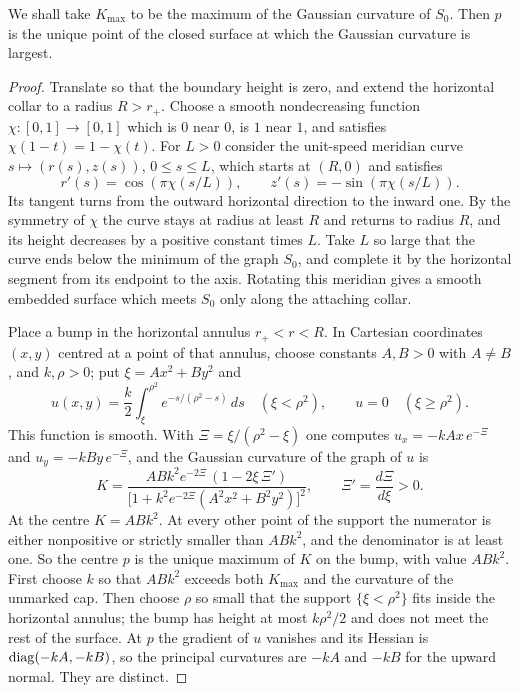We shall take $K_{\max}$ to be the maximum of the Gaussian curvature
of $S_0$. Then $p$ is the unique point of the closed surface at which
the Gaussian curvature is largest.

\begin{proof}
Translate so that the boundary height is zero, and extend the
horizontal collar to a radius $R>r_+$. Choose a smooth nondecreasing
function $\chi:[0,1]\to[0,1]$ which is $0$ near $0$, is $1$ near $1$,
and satisfies $\chi(1-t)=1-\chi(t)$. For $L>0$ consider the unit-speed
meridian curve $s\mapsto(r(s),z(s))$, $0\le s\le L$, which starts at
$(R,0)$ and satisfies
\[
 r'(s)=\cos(\pi\chi(s/L)),\qquad
 z'(s)=-\sin(\pi\chi(s/L)).
\]
Its tangent turns from the outward horizontal direction to the inward
one. By the symmetry of $\chi$ the curve stays at radius at least $R$
and returns to radius $R$, and its height decreases by a positive
constant times $L$. Take $L$ so large that the curve ends below the
minimum of the graph $S_0$, and complete it by the horizontal segment
from its endpoint to the axis. Rotating this meridian gives a smooth
embedded surface which meets $S_0$ only along the attaching collar.

Place a bump in the horizontal annulus $r_+<r<R$. In Cartesian
coordinates $(x,y)$ centred at a point of that annulus, choose
constants $A,B>0$ with $A\ne B$, and $k,\rho>0$; put $\xi=Ax^2+By^2$
and
\[
 u(x,y)=\frac{k}{2}\int_\xi^{\rho^2}
       e^{-s/(\rho^2-s)}\,ds\quad(\xi<\rho^2),
 \qquad u=0\quad(\xi\ge\rho^2).
\]
This function is smooth. With $\Xi=\xi/(\rho^2-\xi)$ one computes
$u_x=-kAx\,e^{-\Xi}$ and $u_y=-kBy\,e^{-\Xi}$, and the Gaussian
curvature of the graph of $u$ is
\begin{equation}\label{eq:marker-curvature}
 K=\frac{ABk^2e^{-2\Xi}\,(1-2\xi\,\Xi')}
 {\bigl[1+k^2e^{-2\Xi}(A^2x^2+B^2y^2)\bigr]^2},
 \qquad \Xi'=\frac{d\Xi}{d\xi}>0 .
\end{equation}
At the centre $K=ABk^2$. At every other point of the support the
numerator is either nonpositive or strictly smaller than $ABk^2$, and
the denominator is at least one. So the centre $p$ is the unique
maximum of $K$ on the bump, with value $ABk^2$. First choose $k$ so
that $ABk^2$ exceeds both $K_{\max}$ and the curvature of the unmarked
cap. Then choose $\rho$ so small that the support $\{\xi<\rho^2\}$
fits inside the horizontal annulus; the bump has height at most
$k\rho^2/2$ and does not meet the rest of the surface. At $p$ the
gradient of $u$ vanishes and its Hessian is $\operatorname{diag}(-kA,-kB)$, so the
principal curvatures are $-kA$ and $-kB$ for the upward normal. They
are distinct.
\end{proof}

